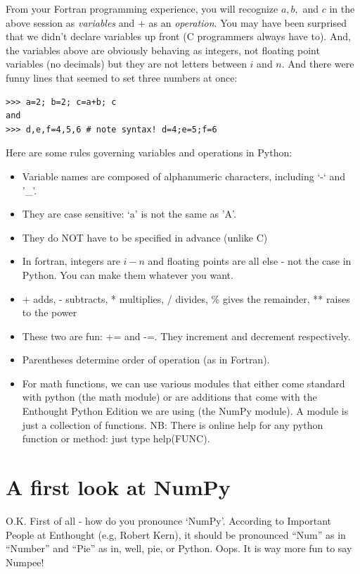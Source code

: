 \documentclass[11pt]{book}
\begin{document}
From your Fortran programming experience, you will recognize $a, b,$ and $c$ in the above session as {\it variables} and $+$ as an {\it operation}. You may have been surprised that we didn't declare variables up front (C programmers always have to).  And, the variables above are obviously behaving as integers, not floating point variables (no decimals) but they are not letters between $i$ and $n$.  And there were funny lines that seemed to set three numbers at once:

{ \color{blue} \begin{verbatim}
>>> a=2; b=2; c=a+b; c
and
>>> d,e,f=4,5,6 # note syntax! d=4;e=5;f=6
\end{verbatim}}
\noindent
Here are some rules governing variables and operations in Python:


\begin{itemize}
\item Variable names are composed of alphanumeric characters, including `-` and '\_'.
\item They are case sensitive:  `a' is not the same as 'A'.
\item They do NOT have to be specified in advance (unlike C)
\item In fortran, integers are  $i-n$ and floating points are all else - not the case in Python. You can make them whatever you want.  
\item + adds, - subtracts, * multiplies, / divides, \% gives the remainder, ** raises to the power
\item These two are fun: {\color{blue}+=} and  {\color{blue}-=}.  They increment and decrement respectively. 
\item Parentheses determine order of operation (as in Fortran). 
\item  For math functions, we can use various modules that either come standard with python (the math module) or are additions that come with the Enthought Python Edition we are using (the NumPy module).  A module is just a collection of functions. NB:  There is online help for any python function or method:  just type help(FUNC). 
\end{itemize}


\section{A first look at NumPy}

O.K.  First of all - how do you pronounce `NumPy'.  According to Important People at Enthought (e.g, Robert Kern), it should be pronounced ``Num'' as in ``Number'' and ``Pie'' as in, well, pie, or Python.  Oops.  It is way more fun to say Numpee!
\end{document}
